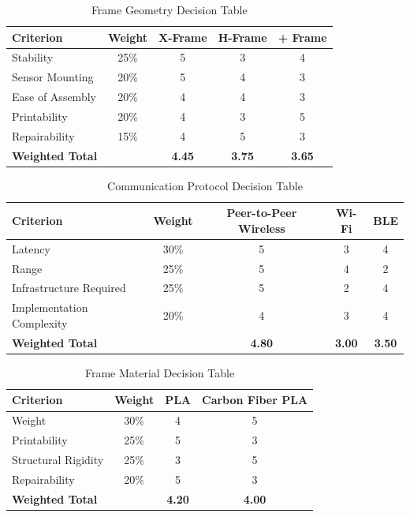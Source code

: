 \documentclass[journal, onecolumn]{IEEEtran}
\begin{document}
\begin{table}[H]
\centering
\small
\begin{tabular}{|l|c|c|c|c|}
\hline
\textbf{Criterion} & \textbf{Weight} & \textbf{X-Frame} & \textbf{H-Frame} & \textbf{+ Frame} \\
\hline
Stability & 25\% & 5 & 3 & 4 \\
\hline
Sensor Mounting & 20\% & 5 & 4 & 3 \\
\hline
Ease of Assembly & 20\% & 4 & 4 & 3 \\
\hline
Printability & 20\% & 4 & 3 & 5 \\
\hline
Repairability & 15\% & 4 & 5 & 3 \\
\hline
\textbf{Weighted Total} & & \textbf{4.45} & \textbf{3.75} & \textbf{3.65} \\
\hline
\end{tabular}
\caption{Frame Geometry Decision Table}
\end{table}

\begin{table}[H]
\centering
\small
\begin{tabular}{|l|c|c|c|c|}
\hline
\textbf{Criterion} & \textbf{Weight} & \textbf{Peer-to-Peer Wireless} & \textbf{Wi-Fi} & \textbf{BLE} \\
\hline
Latency & 30\% & 5 & 3 & 4 \\
\hline
Range & 25\% & 5 & 4 & 2 \\
\hline
Infrastructure Required & 25\% & 5 & 2 & 4 \\
\hline
Implementation Complexity & 20\% & 4 & 3 & 4 \\
\hline
\textbf{Weighted Total} & & \textbf{4.80} & \textbf{3.00} & \textbf{3.50} \\
\hline
\end{tabular}
\caption{Communication Protocol Decision Table}
\end{table}

\begin{table}[H]
\centering
\small
\begin{tabular}{|l|c|c|c|}
\hline
\textbf{Criterion} & \textbf{Weight} & \textbf{PLA} & \textbf{Carbon Fiber PLA} \\
\hline
Weight & 30\% & 4 & 5 \\
\hline
Printability & 25\% & 5 & 3 \\
\hline
Structural Rigidity & 25\% & 3 & 5 \\
\hline
Repairability & 20\% & 5 & 3 \\
\hline
\textbf{Weighted Total} & & \textbf{4.20} & \textbf{4.00} \\
\hline
\end{tabular}
\caption{Frame Material Decision Table}
\end{table}
\end{document}
